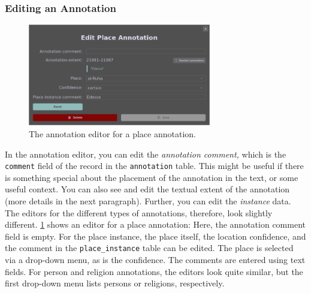 \subsubsection{Editing an Annotation}
\label{sec:annotation-editing}

\begin{figure}[htb]
  \centering
  \includegraphics[width=8cm]{../src/assets/annotator-documentation/edit-place-annotation.png}

  \caption{
    The annotation editor for a place annotation.
  }
  \label{fig:edit-place-annotation}
\end{figure}

In the annotation editor, you can edit the \emph{annotation comment,} which is the \verb!comment! field of the record in the \verb!annotation! table.
This might be useful if there is something special about the placement of the annotation in the text, or some useful context.
You can also see and edit the textual extent of the annotation (more details in the next paragraph).
Further, you can edit the \emph{instance} data.
The editors for the different types of annotations, therefore, look slightly different.
\cref{fig:edit-place-annotation} shows an editor for a place annotation:
Here, the annotation comment field is empty.
For the place instance, the place itself, the location confidence, and the comment in the \verb!place_instance! table can be edited.
The place is selected via a drop-down menu, as is the confidence.
The comments are entered using text fields.
For person and religion annotations, the editors look quite similar, but the first drop-down menu lists persons or religions, respectively.

